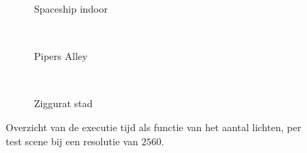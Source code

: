 \begin{figure}[p]
  \begin{adjustbox}{minipage=\textwidth, scale=0.7}
    \begin{subfigure}[b]{\textwidth}
      \centering
      \def\svgwidth{\textwidth}
      
      \caption{Spaceship indoor}
      \label{fig:fds-test-lights:indoor}
    \end{subfigure}
  \end{adjustbox} \\
  \begin{adjustbox}{minipage=\textwidth, scale=0.7}
    \begin{subfigure}[b]{\textwidth}
      \centering
      \def\svgwidth{\textwidth}
      
      \caption{Pipers Alley}
      \label{fig:fds-test-lights:alley}
    \end{subfigure}
  \end{adjustbox} \\
  \begin{adjustbox}{minipage=\textwidth, scale=0.7}
    \begin{subfigure}[b]{\textwidth}
      \centering
      \def\svgwidth{\textwidth}
      
      \caption{Ziggurat stad}
      \label{fig:fds-test-lights:city}
    \end{subfigure}
  \end{adjustbox}
  \caption{Overzicht van de executie tijd als functie van het aantal lichten,
           per test scene bij een resolutie van $2560$.}
  \label{fig:fds-test-lights}
\end{figure}

